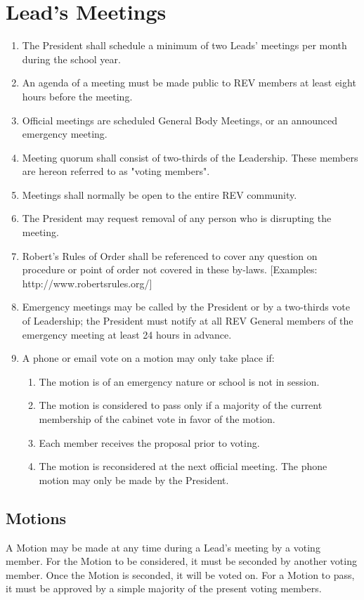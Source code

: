 \section{Lead's Meetings}
\label{leads}

\begin{enumerate}
\item The President shall schedule a minimum of two Leads’ meetings per month during the school
year. 
\item An agenda of a meeting must be made public to REV members at least eight hours before
the meeting. 
\item Official meetings are scheduled General Body Meetings, or an announced emergency meeting.
\item Meeting quorum shall consist of two-thirds of the Leadership. These members are hereon referred to as "voting members".
\item Meetings shall normally be open to the entire REV community. 
\item The President may request removal of any person who is disrupting the meeting. 
\item Robert's Rules of Order shall be referenced to cover any question on procedure or point of order
not covered in these by-laws. [Examples: http://www.robertsrules.org/]
\item Emergency meetings may be called by the President or by a two-thirds vote of Leadership; the President must notify at all REV General members
of the emergency meeting at least 24 hours in advance. 
\item A phone or email vote on a motion may only take place if: 
    \begin{enumerate}
    \item The motion is of an emergency nature or school is not in session. 
    \item The motion is considered to pass only if a majority of the current membership of the
cabinet vote in favor of the motion. 
    \item Each member receives the proposal prior to voting.
    \item The motion is reconsidered at the next official meeting. The phone motion may only be
made by the President.
    \end{enumerate}
\end{enumerate}

\subsection{Motions}
\label{leads:motions}

A Motion may be made at any time during a Lead's meeting by a voting member. For the Motion to be considered, it must be seconded by another voting member. Once the Motion is seconded, it will be voted on. For a Motion to pass, it must be approved by a simple majority of the present voting members.
